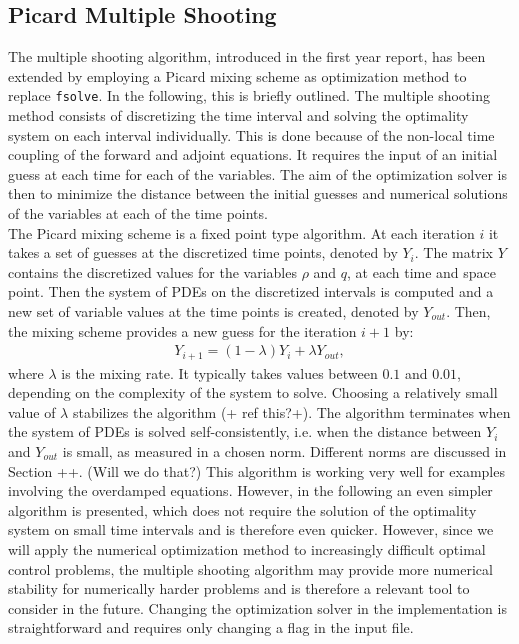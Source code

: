 \documentclass[11pt, a4paper]{article}
\theoremstyle{definition}
\begin{document}
\subsection{Picard Multiple Shooting}
The multiple shooting algorithm, introduced in the first year report, has been extended by employing a Picard mixing scheme as optimization method to replace \texttt{fsolve}. In the following, this is briefly outlined.
The multiple shooting method consists of discretizing the time interval and solving the optimality system on each interval individually. This is done because of the non-local time coupling of the forward and adjoint equations. It requires the input of an initial guess at each time for each of the variables. The aim of the optimization solver is then to minimize the distance between the initial guesses and numerical solutions of the variables at each of the time points. \\
The Picard mixing scheme is a fixed point type algorithm. At each iteration $i$ it takes a set of guesses at the discretized time points, denoted by $Y_i$. The matrix $Y$ contains the discretized values for the variables $\rho$ and $q$, at each time and space point.
Then the system of PDEs on the discretized intervals is computed and a new set of variable values at the time points is created, denoted by $Y_{out}$. Then, the mixing scheme provides a new guess for the iteration $i+1$ by:
\begin{align*}
Y_{i+1} = (1 - \lambda)Y_i + \lambda Y_{out},
\end{align*}
where $\lambda$ is the mixing rate. It typically takes values between $0.1$ and $0.01$, depending on the complexity of the system to solve. Choosing a relatively small value of $\lambda$ stabilizes the algorithm (+ ref this?+). 
The algorithm terminates when the system of PDEs is solved self-consistently, i.e. when the distance between $Y_i$ and $Y_{out}$ is small, as measured in a chosen norm. Different norms are discussed in Section ++. (Will we do that?)
This algorithm is working very well for examples involving the overdamped equations. However, in the following an even simpler algorithm is presented, which does not require the solution of the optimality system on small time intervals and is therefore even quicker. However, since we will apply the numerical optimization method to increasingly difficult optimal control problems, the multiple shooting algorithm may provide more numerical stability for numerically harder problems and is therefore a relevant tool to consider in the future. Changing the optimization solver in the implementation is straightforward and requires only changing a flag in the input file.
\end{document}

